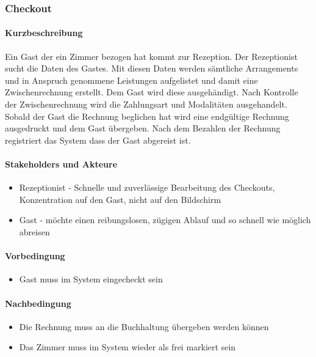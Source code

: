 \subsubsection{Checkout}
\label{UseCase_Checkout}

\paragraph{Kurzbeschreibung}
   Ein \Gls{Gast} der ein \Gls{Zimmer} bezogen hat kommt zur \Gls{Rezeption}.
   Der \Gls{Rezeptionist} sucht die Daten des \Gls{Gast}es. Mit diesen Daten
   werden sämtliche \Glspl{Arrangement} und in Anspruch genommene
   Leistungen aufgelistet und damit eine \Gls{Zwischenrechnung} erstellt.
   Dem \Gls{Gast} wird diese ausgehändigt. Nach Kontrolle der
   \Gls{Zwischenrechnung} wird die Zahlungsart und Modalitäten ausgehandelt.
   Sobald der \Gls{Gast} die \Gls{Rechnung} beglichen  hat wird eine endgültige
   Rechnung ausgedruckt und dem \Gls{Gast} übergeben.
   Nach dem  Bezahlen der \Gls{Rechnung} registriert das System dass der
   \Gls{Gast} abgereist ist.

\paragraph{Stakeholders und Akteure}
\begin{itemize}
	\item \Gls{Rezeptionist} - Schnelle und zuverlässige Bearbeitung des
	\Gls{Checkout}s, Konzentration auf den \Gls{Gast}, nicht auf den Bildschirm
	\item \Gls{Gast} - möchte einen reibungslosen, zügigen Ablauf und so schnell
	wie möglich abreisen
\end{itemize}

\paragraph{Vorbedingung}
\begin{itemize}
	\item Gast muss im System eingecheckt sein
\end{itemize}

\paragraph{Nachbedingung}
\begin{itemize}
	\item Die Rechnung muss an die Buchhaltung übergeben werden können
	\item Das Zimmer muss im System wieder als frei markiert sein
\end{itemize}

